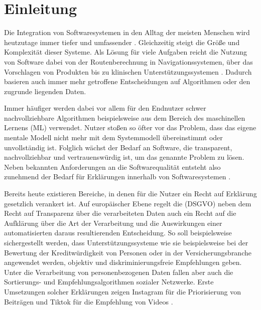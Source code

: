 \chapter{Einleitung}

Die Integration von Softwaresystemen in den Alltag der meisten Menschen wird heutzutage immer tiefer und umfassender \cite{carvalho2020developers}.  Gleichzeitig steigt die Größe und Komplexität dieser Systeme. Als Lösung für viele Aufgaben reicht die Nutzung von Software dabei von der Routenberechnung in Navigationssystemen, über das Vorschlagen von Produkten bis zu klinischen Unterstützungssystemen \cite{chazette2020explainability, tintarev2015explaining, cypko2017guide}. Dadurch basieren auch immer mehr getroffene Entscheidungen auf Algorithmen oder den zugrunde liegenden Daten.

Immer häufiger werden dabei vor allem für den Endnutzer schwer nachvollziehbare Algorithmen beispielsweise aus dem Bereich des maschinellen Lernens (ML) verwendet. Nutzer stoßen so öfter vor das Problem, dass das eigene mentale Modell nicht mehr mit dem Systemmodell übereinstimmt oder unvollständig ist. Folglich wächst der Bedarf an Software, die transparent, nachvollziehbar und vertrauenswürdig ist, um das genannte Problem zu lösen. Neben bekannten Anforderungen an die Softwarequalität \cite{international2011iso} entsteht also zunehmend der Bedarf für Erklärungen innerhalb von Softwaresystemen \cite{chazette_end-users_nodate}.

Bereits heute existieren Bereiche, in denen für die Nutzer ein \glqq Recht auf Erklärung\grqq{} gesetzlich verankert ist. Auf europäischer Ebene regelt die  (DSGVO) \cite{eu_verordnung_2016} neben dem Recht auf Transparenz über die verarbeiteten Daten auch ein Recht auf die Aufklärung über die Art der Verarbeitung und die Auswirkungen einer automatisierten daraus resultierenden Entscheidung. So soll beispielsweise sichergestellt werden, dass Unterstützungssysteme wie sie beispielsweise bei der Bewertung der Kreditwürdigkeit von Personen oder in der Versicherungsbranche angewendet werden, objektiv und diskriminierungsfreie Empfehlungen geben. Unter die Verarbeitung von personenbezogenen Daten fallen aber auch die Sortierungs- und Empfehlungsalgorithmen sozialer Netzwerke. Erste Umsetzungen solcher Erklärungen zeigen Instagram für die Priorisierung von Beiträgen und Tiktok für die Empfehlung von Videos \cite{mosseri_shedding_2021,tiktok_technology_limited_how_2021}.

